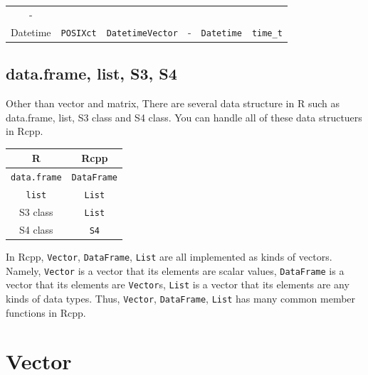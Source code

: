 \documentclass[]{book}
\theoremstyle{definition}
\theoremstyle{definition}
\theoremstyle{remark}
\begin{document}
\begin{longtable}[]{@{}cccccc@{}}
\begin{minipage}[t]{0.07\columnwidth}
-\strut
\end{minipage}\tabularnewline
\begin{minipage}[t]{0.07\columnwidth}\centering\strut
Datetime\strut
\end{minipage} & \begin{minipage}[t]{0.07\columnwidth}\centering\strut
\texttt{POSIXct}\strut
\end{minipage} & \begin{minipage}[t]{0.07\columnwidth}\centering\strut
\texttt{DatetimeVector}\strut
\end{minipage} & \begin{minipage}[t]{0.07\columnwidth}\centering\strut
-\strut
\end{minipage} & \begin{minipage}[t]{0.07\columnwidth}\centering\strut
\texttt{Datetime}\strut
\end{minipage} & \begin{minipage}[t]{0.07\columnwidth}\centering\strut
\texttt{time\_t}\strut
\end{minipage}\tabularnewline
\bottomrule
\end{longtable}

\section{data.frame, list, S3, S4}\label{data.frame-list-s3-s4}

Other than vector and matrix, There are several data structure in R such
as data.frame, list, S3 class and S4 class. You can handle all of these
data structuers in Rcpp.

\begin{longtable}[]{@{}cc@{}}
\toprule
R & Rcpp\tabularnewline
\midrule
\endhead
\texttt{data.frame} & \texttt{DataFrame}\tabularnewline
\texttt{list} & \texttt{List}\tabularnewline
S3 class & \texttt{List}\tabularnewline
S4 class & \texttt{S4}\tabularnewline
\bottomrule
\end{longtable}

In Rcpp, \texttt{Vector}, \texttt{DataFrame}, \texttt{List} are all
implemented as kinds of vectors. Namely, \texttt{Vector} is a vector
that its elements are scalar values, \texttt{DataFrame} is a vector that
its elements are \texttt{Vector}s, \texttt{List} is a vector that its
elements are any kinds of data types. Thus, \texttt{Vector},
\texttt{DataFrame}, \texttt{List} has many common member functions in
Rcpp.

\chapter{Vector}\label{vector}
\end{document}
